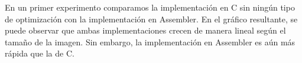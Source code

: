 \documentclass[a4paper]{article}
\begin{document}
En un primer experimento comparamos la implementación en C sin ningún tipo de optimización con la implementación en Assembler. En el gráfico
resultante, se puede observar que ambas implementaciones crecen de manera lineal según el tamaño de la imagen. Sin embargo, la implementación en
Assembler es aún más rápida que la de C.

\noindent%
\begin{minipage}{\linewidth}%
\end{minipage}
\ \
\end{document}
